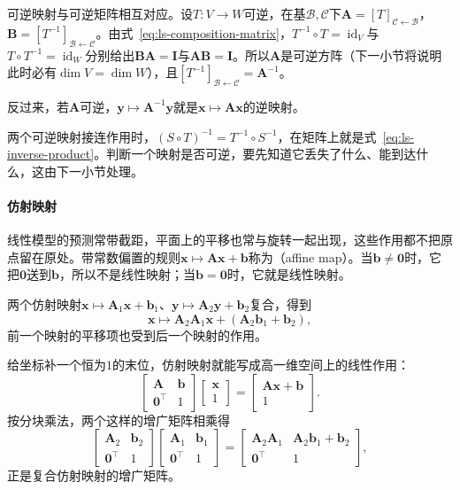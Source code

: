 可逆映射与可逆矩阵相互对应。设$T:V\to W$可逆，在基$\mathcal B,\mathcal C$下$\bm A=[T]_{\mathcal C\leftarrow\mathcal B}$，$\bm B=[T^{-1}]_{\mathcal B\leftarrow\mathcal C}$。由式~\eqref{eq:ls-composition-matrix}，$T^{-1}\circ T=\operatorname{id}_V$与$T\circ T^{-1}=\operatorname{id}_W$分别给出$\bm B\bm A=\bm I$与$\bm A\bm B=\bm I$。所以$\bm A$是可逆方阵（下一小节将说明此时必有$\dim V=\dim W$），且$[T^{-1}]_{\mathcal B\leftarrow\mathcal C}=\bm A^{-1}$。

反过来，若$\bm A$可逆，$\bm y\mapsto\bm A^{-1}\bm y$就是$\bm x\mapsto\bm A\bm x$的逆映射。

两个可逆映射接连作用时，$(S\circ T)^{-1}=T^{-1}\circ S^{-1}$，在矩阵上就是式~\eqref{eq:ls-inverse-product}。判断一个映射是否可逆，要先知道它丢失了什么、能到达什么，这由下一小节处理。

\paragraph{仿射映射}
\label{sec:ls-affine-maps}
线性模型的预测常带截距，平面上的平移也常与旋转一起出现，这些作用都不把原点留在原处。带常数偏置的规则$\bm x\mapsto\bm A\bm x+\bm b$称为（affine map）。当$\bm b\neq\bm0$时，它把$\bm0$送到$\bm b$，所以不是线性映射；当$\bm b=\bm0$时，它就是线性映射。

两个仿射映射$\bm x\mapsto\bm A_1\bm x+\bm b_1$、$\bm y\mapsto\bm A_2\bm y+\bm b_2$复合，得到
\[
 \bm x\mapsto\bm A_2\bm A_1\bm x+(\bm A_2\bm b_1+\bm b_2),
\]
前一个映射的平移项也受到后一个映射的作用。

给坐标补一个恒为$1$的末位，仿射映射就能写成高一维空间上的线性作用：
\begin{equation}
 \begin{bmatrix}\bm A&\bm b\\ \bm0^\top&1\end{bmatrix}
 \begin{bmatrix}\bm x\\1\end{bmatrix}
 =
 \begin{bmatrix}\bm A\bm x+\bm b\\1\end{bmatrix}.
 \label{eq:ls-affine-homogeneous}
\end{equation}
按分块乘法，两个这样的增广矩阵相乘得
\[
 \begin{bmatrix}\bm A_2&\bm b_2\\ \bm0^\top&1\end{bmatrix}
 \begin{bmatrix}\bm A_1&\bm b_1\\ \bm0^\top&1\end{bmatrix}
 =\begin{bmatrix}\bm A_2\bm A_1&\bm A_2\bm b_1+\bm b_2\\ \bm0^\top&1\end{bmatrix},
\]
正是复合仿射映射的增广矩阵。

